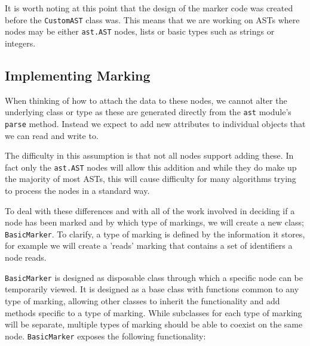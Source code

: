 \documentclass{report}
\begin{document}
It is worth noting at this point that the design of the marker code was created before the \texttt{CustomAST} class was. This
means that we are working on ASTs where nodes may be either \texttt{ast.AST} nodes, lists or basic types such as strings or
integers.

\subsection{Implementing Marking}

When thinking of how to attach the data to these nodes, we cannot alter the underlying class or type as these are generated directly
from the \texttt{ast} module's \texttt{parse} method. Instead we expect to add new attributes to individual objects that we can read
and write to.

The difficulty in this assumption is that not all nodes support adding these. In fact only the \texttt{ast.AST} nodes will allow this
addition and while they do make up the majority of most ASTs, this will cause difficulty for many algorithms trying to process the
nodes in a standard way.

To deal with these differences and with all of the work involved in deciding if a node has been marked and by which type of markings,
we will create a new class; \texttt{BasicMarker}. To clarify, a type of marking is defined by the information it stores, for example
we will create a 'reads' marking that contains a set of identifiers a node reads.


\texttt{BasicMarker} is designed as disposable class through which a specific node can be temporarily viewed. It is designed as a base
class with functions common to any type of marking, allowing other classes to inherit the functionality and add methods specific to a
type of marking. While subclasses for each type of marking will be separate, multiple types of marking should be able to coexist on the
same node. \texttt{BasicMarker} exposes the following functionality:
\end{document}
